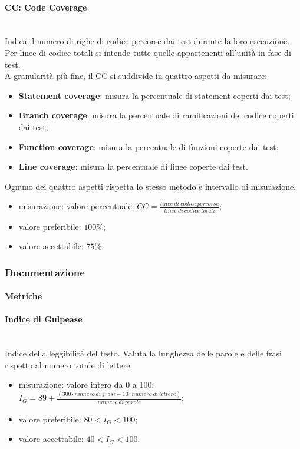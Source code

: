 			\paragraph*{CC: Code Coverage}\mbox{}\\
				Indica il numero di righe di codice percorse dai test durante la loro esecuzione. Per linee di codice totali si intende tutte quelle appartenenti all'unità in fase di test.\\
				A granularità più fine, il CC si suddivide in quattro aspetti da misurare:
				\begin{itemize}
					\item \textbf{Statement coverage}: misura la percentuale di statement coperti dai test;
					\item \textbf{Branch coverage}: misura la percentuale di ramificazioni del codice coperti dai test;
					\item \textbf{Function coverage}: misura la percentuale di funzioni coperte dai test;
					\item \textbf{Line coverage}: misura la percentuale di linee coperte dai test.
				\end{itemize}
				Ognuno dei quattro aspetti rispetta lo stesso metodo e intervallo di misurazione.
				\begin{itemize}
					\item misurazione: valore percentuale: $CC = \frac{linee\ di\ codice\ percorse}{linee\ di\ codice\ totali}$;
					\item valore preferibile: $100\%$;
					\item valore accettabile: $75\%$.
				\end{itemize}
	\subsubsection{Documentazione}
		\paragraph{Metriche}
			\paragraph*{Indice di Gulpease}\mbox{}\\
			Indice della leggibilità del testo. Valuta la lunghezza delle parole e delle frasi rispetto al numero totale di lettere. 
			\begin{itemize}
				\item misurazione: valore intero da 0 a 100:\newline 	
				$I_G = 89+ \frac{(300 \cdot numero\ di\ frasi - 10 \cdot numero\ di\ lettere)}{numero\ di\ parole}$;	
				\item valore preferibile: $80 < I_G < 100$;
				\item valore accettabile: $40 < I_G < 100$.
			\end{itemize}

